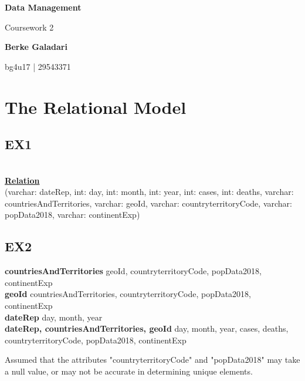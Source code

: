 \documentclass[12pt]{extarticle}
\begin{document}
    \begin{titlepage}
    \begin{center}
        \textbf {Data Management}
    
        \vspace{0.2cm}
        Coursework 2
    
        \vspace{2cm}
        \textbf{Berke Galadari}
    
        \vspace{0.2cm}
        bg4u17 | 29543371

    \end{center}
\end{titlepage}

\section{The Relational Model}
    \vspace{0.4cm}
    \subsection{EX1}
    \vspace{0.2cm}
    \\\underline{\textbf{Relation}}
    \\(varchar: dateRep, int: day, int: month, int: year, int: cases, int: deaths, varchar: countriesAndTerritories, varchar: geoId, varchar: countryterritoryCode, varchar: popData2018, varchar: continentExp)
    
    \vspace{0.4cm}
    \subsection{EX2}
    \vspace{0.2cm}
    \textbf{countriesAndTerritories} \to geoId, countryterritoryCode, popData2018, continentExp
    \\\textbf{geoId} \to countriesAndTerritories, countryterritoryCode, popData2018, continentExp
    \\\textbf{dateRep} \to day, month, year
    \\\textbf{dateRep, countriesAndTerritories, geoId} \to day, month, year, cases, deaths, \\countryterritoryCode, popData2018, continentExp
    \newline 
    
    Assumed that the attributes "countryterritoryCode" and "popData2018" may take a null value, or may not be accurate in determining unique elements.
    
\end{document}
